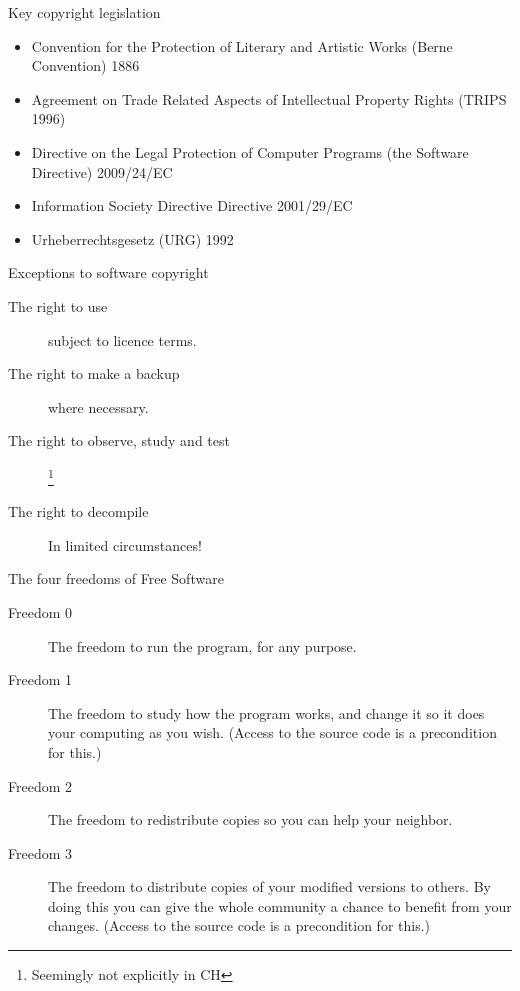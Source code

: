 \documentclass[t]{beamer}
\begin{document}
\begin{frame}{Key copyright legislation}

  \begin{itemize}
  \item Convention for the Protection of Literary and Artistic Works (Berne
    Convention) 1886
  \item Agreement on Trade Related Aspects of Intellectual Property Rights
    (TRIPS 1996)  
  \item Directive on the Legal Protection of Computer Programs (the Software
    Directive) 2009/24/EC  
  \item Information Society Directive Directive 2001/29/EC 
  \item Urheberrechtsgesetz (URG) 1992
  \end{itemize}
  
\end{frame}

\begin{frame}{Exceptions to software copyright}

\begin{description}
  \item[The right to use] subject to licence terms.
  \item[The right to make a backup] where necessary.
  \item[The right to observe, study and test]\footnote{Seemingly not
      explicitly in CH} 
  \item [The right to decompile] In limited circumstances!
\end{description}
\end{frame}

\begin{frame}{The four freedoms of Free Software}
\begin{description}
  \item[Freedom 0] The freedom to run the program, for any purpose.
  \item[Freedom 1] The freedom to study how the program works, and change it so it does your computing as you wish. (Access to the source code is a precondition for this.)
  \item[Freedom 2] The freedom to redistribute copies so you can help your neighbor.
  \item[Freedom 3] The freedom to distribute copies of your modified
    versions to others. By doing this you can give the whole community a
    chance to benefit from your changes. (Access to the source code is a
    precondition for this.)
\end{description}
\end{frame}
\end{document}
